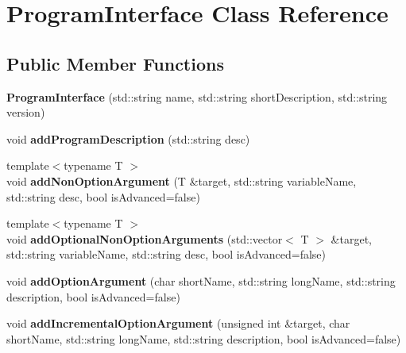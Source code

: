 \hypertarget{classProgramInterface}{}\section{Program\+Interface Class Reference}
\label{classProgramInterface}
\subsection*{Public Member Functions}
\begin{DoxyCompactItemize}
\item 
\mbox{\label{classProgramInterface_a1500f81c169fc1f432683d21fbd3f2f1}} 
{\bfseries Program\+Interface} (std\+::string name, std\+::string short\+Description, std\+::string version)
\item 
\mbox{\label{classProgramInterface_a25a77ffcc8ec078a96e1eb83da5faf5e}} 
void {\bfseries add\+Program\+Description} (std\+::string desc)
\item 
\mbox{\label{classProgramInterface_a03881e0e2d5bcae48e02011b7d4012b7}} 
{\footnotesize template$<$typename T $>$ }\\void {\bfseries add\+Non\+Option\+Argument} (T \&target, std\+::string variable\+Name, std\+::string desc, bool is\+Advanced=false)
\item 
\mbox{\label{classProgramInterface_a2b64153fca1c424163c572f89fc9e2e9}} 
{\footnotesize template$<$typename T $>$ }\\void {\bfseries add\+Optional\+Non\+Option\+Arguments} (std\+::vector$<$ T $>$ \&target, std\+::string variable\+Name, std\+::string desc, bool is\+Advanced=false)
\item 
\mbox{\label{classProgramInterface_a76ce3af8085bc098910eb14aa6e92345}} 
void {\bfseries add\+Option\+Argument} (char short\+Name, std\+::string long\+Name, std\+::string description, bool is\+Advanced=false)
\item 
\mbox{\label{classProgramInterface_aa79d2d7ab562cec4268b265743f51ea9}} 
void {\bfseries add\+Incremental\+Option\+Argument} (unsigned int \&target, char short\+Name, std\+::string long\+Name, std\+::string description, bool is\+Advanced=false)

\end{DoxyCompactItemize}
